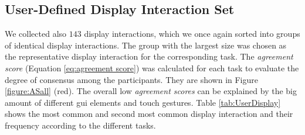 \documentclass[sigchi]{acmart}
\begin{document}
	\subsection{User-Defined Display Interaction Set}
	We collected also $143$ display interactions, which we once again sorted into groups of identical display interactions. The group with the largest size was chosen as the representative display interaction for the corresponding task. The \textit{agreement score} (Equation \ref{eq:agreement score}) was calculated for each task to evaluate the degree of consensus among the participants. They are shown in Figure \ref{figure:ASall} (red). The overall low \textit{agreement scores} can be explained by the big amount of different \ac{gui} elements and touch gestures. 
	Table \ref{tab:UserDisplay} shows the most common and second most common display interaction and their frequency according to the different tasks.
\end{document}
